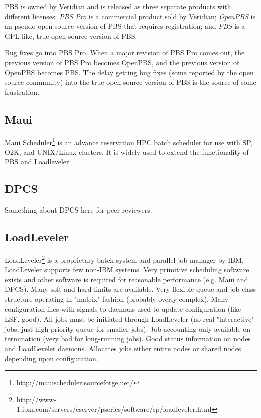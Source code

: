 PBS is owned by Veridian and is released as three separate products with
different licenses: {\em PBS Pro} is a commercial product sold by Veridian;
{\em OpenPBS} is an pseudo open source version of PBS that requires 
registration; and
{\em PBS} is a GPL-like, true open source version of PBS.

Bug fixes go into PBS Pro.  When a major revision of PBS Pro comes out,
the previous version of PBS Pro becomes OpenPBS, and the previous version
of OpenPBS becomes PBS.  The delay getting bug fixes (some reported by the
open source community) into the true open source version of PBS is the source
of some frustration.

\subsection{Maui}

Maui Scheduler\footnote{http://mauischeduler.sourceforge.net/}
is an advance reservation HPC batch scheduler for use with SP, 
O2K, and UNIX/Linux clusters. It is widely used to extend the 
functionality of PBS and Loadleveler

\subsection{DPCS}

Something about DPCS here for peer reviewers.

\subsection{LoadLeveler}

LoadLeveler\footnote{
http://www-1.ibm.com/servers/eserver/pseries/software/sp/loadleveler.html}
 is a proprietary batch system and parallel job manager by 
IBM. LoadLeveler supports few non-IBM systems. Very primitive 
scheduling software exists and other software is required for reasonable 
performance (e.g. Maui and DPCS). Many soft and hard limits are available. Very 
flexible queue and job class structure operating in "matrix" fashion 
(probably overly complex). Many configuration files with signals to 
daemons used to update configuration (like LSF, good). All jobs must 
be initiated through LoadLeveler (no real "interactive" jobs, just 
high priority queue for smaller jobs). Job accounting only available 
on termination (very bad for long-running jobs). Good status 
information on nodes and LoadLeveler daemons. Allocates jobs either entire 
nodes or shared nodes depending upon configuration.

